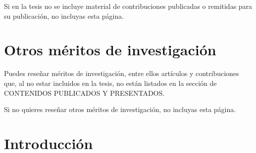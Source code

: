\documentclass[12pt]{report} %
\begin{document}
Si en la tesis no se incluye material de contribuciones publicadas o remitidas para su publicación, no incluyas esta página.

\chapter*{Otros méritos de investigación}
\thispagestyle{empty}
Puedes reseñar méritos de investigación, entre ellos artículos y contribuciones que, al no estar incluidos en la tesis, no están listados en la sección de CONTENIDOS PUBLICADOS Y PRESENTADOS.

Si no quieres reseñar otros méritos de investigación, no incluyas esta página. 




\tableofcontents
\thispagestyle{fancy}

\listoffigures
\thispagestyle{fancy}

\listoftables
\thispagestyle{fancy}

\clearpage
{} %

\chapter{Introducción}

	



\clearpage
{}
\printbibliography




\end{document}
